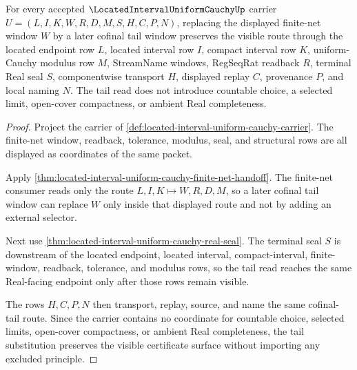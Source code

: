 \begin{theorem}
\label{thm:located-interval-uniform-cauchy-tail-stability}
For every accepted $\LocatedIntervalUniformCauchyUp$ carrier $U=(L,I,K,W,R,D,M,S,H,C,P,N)$, replacing the displayed finite-net window $W$ by a later cofinal tail window preserves the visible route through the located endpoint row $L$, located interval row $I$, compact interval row $K$, uniform-Cauchy modulus row $M$, StreamName windows, RegSeqRat readback $R$, terminal Real seal $S$, componentwise transport $H$, displayed replay $C$, provenance $P$, and local naming $N$. The tail read does not introduce countable choice, a selected limit, open-cover compactness, or ambient Real completeness.
\end{theorem}
\begin{proof}
Project the carrier of \autoref{def:located-interval-uniform-cauchy-carrier}. The finite-net window, readback, tolerance, modulus, seal, and structural rows are all displayed as coordinates of the same packet.

Apply \autoref{thm:located-interval-uniform-cauchy-finite-net-handoff}. The finite-net consumer reads only the route $L,I,K \longmapsto W,R,D,M$, so a later cofinal tail window can replace $W$ only inside that displayed route and not by adding an external selector.

Next use \autoref{thm:located-interval-uniform-cauchy-real-seal}. The terminal seal $S$ is downstream of the located endpoint, located interval, compact-interval, finite-window, readback, tolerance, and modulus rows, so the tail read reaches the same Real-facing endpoint only after those rows remain visible.

The rows $H,C,P,N$ then transport, replay, source, and name the same cofinal-tail route. Since the carrier contains no coordinate for countable choice, selected limits, open-cover compactness, or ambient Real completeness, the tail substitution preserves the visible certificate surface without importing any excluded principle.
\end{proof}


